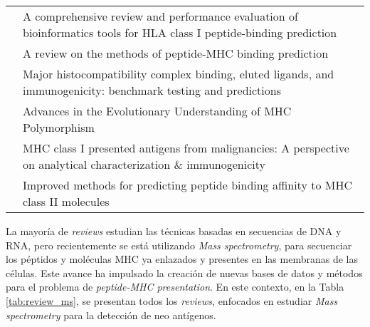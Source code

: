 \begin{table}[H]
\begin{tabular}{p{3cm}p{10cm}}
		\cite{mei2020comprehensive}         & A comprehensive review and performance evaluation of bioinformatics tools for HLA class I peptide-binding prediction \\
		\cite{liu2020review}                & A review on the methods of peptide-MHC binding prediction                                                            \\
		\cite{paul2020major}                & Major histocompatibility complex binding, eluted ligands, and immunogenicity: benchmark testing and predictions      \\
		\cite{radwan2020advances}           & Advances in the Evolutionary Understanding of MHC Polymorphism                                                       \\
		\cite{schmidt2019mhc}               & MHC class I presented antigens from malignancies: A perspective on analytical characterization \& immunogenicity     \\
		\cite{jensen2018improved}           & Improved methods for predicting peptide binding affinity to MHC class II molecules                                  
	\end{tabular}
\end{table}

La mayoría de \textit{reviews} estudian las técnicas basadas en secuencias de DNA y RNA, pero recientemente se está utilizando \textit{Mass spectrometry}, para secuenciar los péptidos y moléculas MHC ya enlazados y presentes en las membranas de las células. Este avance ha impulsado la creación de nuevas bases de datos y métodos para el problema de \textit{peptide-MHC presentation}. En este contexto, en la Tabla \ref{tab:review_ms}, se presentan todos los \textit{reviews}, enfocados en estudiar \textit{Mass spectrometry} para la detección de neo antígenos.



